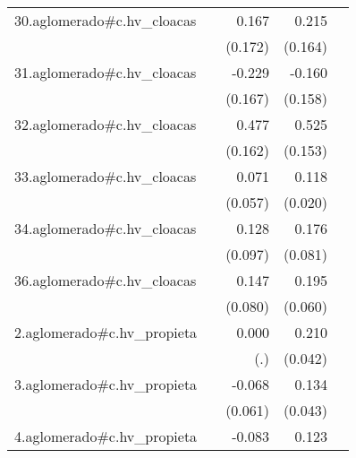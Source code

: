 {\begin{longtable}{l*{4}{D{.}{.}{-1}}}
\addlinespace
30.aglomerado#c.hv\_cloacas&                     &       0.167         &       0.215         &                     \\
            &                     &     (0.172)         &     (0.164)         &                     \\
\addlinespace
31.aglomerado#c.hv\_cloacas&                     &      -0.229         &      -0.160         &                     \\
            &                     &     (0.167)         &     (0.158)         &                     \\
\addlinespace
32.aglomerado#c.hv\_cloacas&                     &       0.477\sym{**} &       0.525\sym{***}&                     \\
            &                     &     (0.162)         &     (0.153)         &                     \\
\addlinespace
33.aglomerado#c.hv\_cloacas&                     &       0.071         &       0.118\sym{***}&                     \\
            &                     &     (0.057)         &     (0.020)         &                     \\
\addlinespace
34.aglomerado#c.hv\_cloacas&                     &       0.128         &       0.176\sym{*}  &                     \\
            &                     &     (0.097)         &     (0.081)         &                     \\
\addlinespace
36.aglomerado#c.hv\_cloacas&                     &       0.147         &       0.195\sym{**} &                     \\
            &                     &     (0.080)         &     (0.060)         &                     \\
\addlinespace
2.aglomerado#c.hv\_propieta&                     &       0.000         &       0.210\sym{***}&                     \\
            &                     &         (.)         &     (0.042)         &                     \\
\addlinespace
3.aglomerado#c.hv\_propieta&                     &      -0.068         &       0.134\sym{**} &                     \\
            &                     &     (0.061)         &     (0.043)         &                     \\
\addlinespace
4.aglomerado#c.hv\_propieta&                     &      -0.083         &       0.123\sym{***}&                     \\

\end{longtable}}

